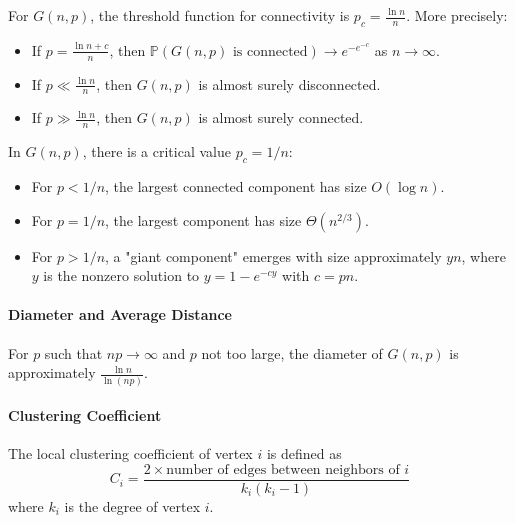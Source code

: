 \documentclass[oneside]{book}
\begin{document}
\begin{theorem}
For $G(n,p)$, the threshold function for connectivity is $p_c = \frac{\ln n}{n}$. More precisely:
\begin{itemize}
\item If $p = \frac{\ln n + c}{n}$, then $\mathbb{P}(G(n,p) \text{ is connected}) \to e^{-e^{-c}}$ as $n \to \infty$.
\item If $p \ll \frac{\ln n}{n}$, then $G(n,p)$ is almost surely disconnected.
\item If $p \gg \frac{\ln n}{n}$, then $G(n,p)$ is almost surely connected.
\end{itemize}
\end{theorem}

\begin{theorem}
In $G(n,p)$, there is a critical value $p_c = 1/n$:
\begin{itemize}
\item For $p < 1/n$, the largest connected component has size $O(\log n)$.
\item For $p = 1/n$, the largest component has size $\Theta(n^{2/3})$.
\item For $p > 1/n$, a "giant component" emerges with size approximately $yn$, where $y$ is the nonzero solution to $y = 1 - e^{-c y}$ with $c = pn$.
\end{itemize}
\end{theorem}

\paragraph{Diameter and Average Distance}
\begin{theorem}[Diameter of $G(n,p)$]
For $p$ such that $np \to \infty$ and $p$ not too large, the diameter of $G(n,p)$ is approximately $\frac{\ln n}{\ln(np)}$.
\end{theorem}

\paragraph{Clustering Coefficient}
\begin{definition}
The local clustering coefficient of vertex $i$ is defined as
\begin{equation}
C_i = \frac{2 \times \text{number of edges between neighbors of } i}{k_i(k_i-1)}
\end{equation}
where $k_i$ is the degree of vertex $i$.
\end{definition}
\end{document}
